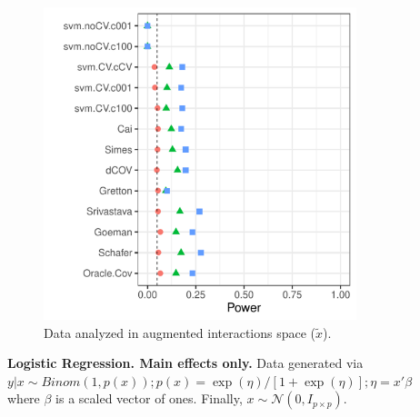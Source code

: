\documentclass[]{bio}
\begin{document}
\begin{figure}[th]
\begin{subfigure}[t]{.45\columnwidth}
		\includegraphics[width=1\columnwidth]{"art/file44"}
		\caption{Data analyzed in augmented interactions space ($\tilde x$).}
		\label{fig:main-only-augmented-space}
	\end{subfigure}
	\caption{\textbf{Logistic Regression. Main effects only.} 
	Data generated via $y|x \sim Binom(1,p(x));
	p(x)=\exp(\eta)/[1+\exp(\eta)];
	\eta=x'\beta$ where 
	$\beta$ is a scaled vector of ones.
	Finally, $x\sim \mathcal{N}(0,I_{p\times p})$. } 
	\label{fig:logistic-main-only}
\end{figure}
\end{document}
